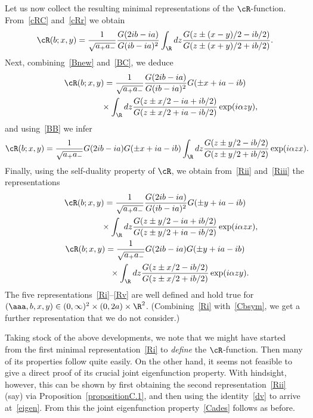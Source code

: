 \documentclass[pdftex]{sigma}
\numberwithin{equation}{section}
\begin{document}
Let us now collect the resulting minimal representations of the $\cR$-function. From~\eqref{cRC} and~\eqref{cRr} we obtain
\begin{gather}\label{Ri}
\cR(b;x,y)=\frac{1}{\sqrt{a_+a_-}}\frac{G(2ib-ia)}{G(ib-ia)^2}
\int_{\R}dz \frac{G(z\pm (x-y)/2-ib/2)}{G(z\pm (x+y)/2+ib/2)}.
\end{gather}
Next, combining~\eqref{Bnew} and~\eqref{BC}, we deduce
\begin{gather}
\cR(b;x,y)=\frac{1}{\sqrt{a_+a_-}}\frac{G(2ib-ia)}{G(ib-ia)^2}
G(\pm x +ia-ib)\nonumber\\
\phantom{\cR(b;x,y)=}{} \times
\int_{\R}dz\frac{G(z\pm x/2-ia+ib/2)}{G(z\pm x/2+ia-ib/2)}\exp(i\alpha zy),\label{Rii}
\end{gather}
and using~\eqref{BB} we infer
\begin{gather}\label{Riii}
\cR(b;x,y)=\frac{1}{\sqrt{a_+a_-}}G(2ib-ia)
G(\pm x +ia-ib)
\int_{\R}dz\frac{G(z\pm y/2-ib/2)}{G(z\pm y/2+ib/2)}\exp(i\alpha zx).\!\!\!
\end{gather}
Finally, using the self-duality property of $\cR$, we obtain from~\eqref{Rii} and~\eqref{Riii} the representations
\begin{gather}
\cR(b;x,y)=\frac{1}{\sqrt{a_+a_-}}\frac{G(2ib-ia)}{G(ib-ia)^2}
G(\pm y +ia-ib)\nonumber\\
\phantom{\cR(b;x,y)=}{}\times
\int_{\R}dz\frac{G(z\pm y/2-ia+ib/2)}{G(z\pm y/2+ia-ib/2)}\exp(i\alpha zx),\label{Riv}
\\
\cR(b;x,y)=\frac{1}{\sqrt{a_+a_-}}G(2ib-ia)
G(\pm y +ia-ib)\nonumber\\
\phantom{\cR(b;x,y)=}{}\times
\int_{\R}dz\frac{G(z\pm x/2-ib/2)}{G(z\pm x/2+ib/2)}\exp(i\alpha zy).\label{Rv}
\end{gather}
The f\/ive representations~\eqref{Ri}--\eqref{Rv} are well def\/ined and hold true for $(\aaa,b,x,y)\in(0,\infty)^2\times(0,2a)\times\R^2$. (Combining~\eqref{Ri} with~\eqref{Cbsym}, we get a further representation that we do not consider.)

Taking stock of the above developments, we note that we might have started from the f\/irst minimal representation~\eqref{Ri} to {\em define} the $\cR$-function. Then many of its properties follow quite easily. On the other hand, it seems not feasible to give a direct proof of its crucial joint eigenfunction property. With hindsight, however, this can be shown by f\/irst obtaining the second representation~\eqref{Rii} (say) via Proposition~\ref{propositionC.1}, and then using the identity~\eqref{dv} to arrive at~\eqref{eigen}. From this the joint eigenfunction property~\eqref{Cades} follows as before.
\end{document}

